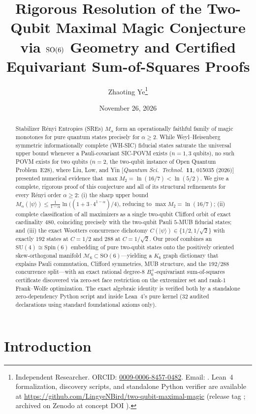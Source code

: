 \documentclass[11pt,a4paper]{article}
\title{\bfseries\Large Rigorous Resolution of the Two-Qubit Maximal Magic Conjecture via $\SO(6)$ Geometry and Certified Equivariant Sum-of-Squares Proofs}
\author{
  Zhaoting Ye\thanks{Independent Researcher. ORCID: \href{https://orcid.org/0009-0006-8457-0482}{0009-0006-8457-0482}. Email: \href{mailto:lingyenbird@qq.com}{\code{lingyenbird@qq.com}}. Lean~4 formalization, discovery scripts, and standalone Python verifier are available at \url{https://github.com/LingyeNBird/two-qubit-maximal-magic} (release tag \code{v1.2}; archived on Zenodo at concept DOI \href{https://doi.org/10.5281/zenodo.24565157}{\code{10.5281/zenodo.24565157}}).}
}
\date{November 26, 2026}
\theoremstyle{plain}
\theoremstyle{definition}
\theoremstyle{remark}
\newcommand{\ket}[1]{\lvert #1 \rangle}
\newcommand{\SO}{\mathrm{SO}}
\newcommand{\SU}{\mathrm{SU}}
\newcommand{\Spin}{\mathrm{Spin}}
\newcommand{\Mman}{\mathcal{M}_6}
\newcommand{\Bplus}{B_6^+}
\begin{document}
\maketitle

\begin{abstract}
Stabilizer R\'enyi Entropies (SREs) $M_\alpha$ form an operationally faithful family of magic monotones for pure quantum states precisely for $\alpha \ge 2$. While Weyl--Heisenberg symmetric informationally complete (WH-SIC) fiducial states saturate the universal upper bound whenever a Pauli-covariant SIC-POVM exists ($n = 1, 3$ qubits), no such POVM exists for two qubits ($n = 2$, the two-qubit instance of Open Quantum Problem~E28), where Liu, Low, and Yin [\textit{Quantum Sci.\ Technol.}\ \textbf{11}, 015035 (2026)] presented numerical evidence that $\max M_2 = \ln(16/7) < \ln(5/2)$. We give a complete, rigorous proof of this conjecture and all of its structural refinements for every R\'enyi order $\alpha \ge 2$: (i) the sharp upper bound $M_\alpha(\ket{\psi}) \le \frac{1}{1-\alpha}\ln\!\bigl((1+3\cdot 4^{1-\alpha})/4\bigr)$, reducing to $\max M_2 = \ln(16/7)$; (ii) complete classification of all maximizers as a single two-qubit Clifford orbit of exact cardinality $480$, coinciding precisely with the two-qubit Pauli $5$-MUB fiducial states; and (iii) the exact Wootters concurrence dichotomy $C(\ket{\psi}) \in \{1/2, 1/\sqrt{2}\}$ with exactly $192$ states at $C = 1/2$ and $288$ at $C = 1/\sqrt{2}$. Our proof combines an $\SU(4) \cong \Spin(6)$ embedding of pure two-qubit states onto the positively oriented skew-orthogonal manifold $\Mman \subset \SO(6)$---yielding a $K_6$ graph dictionary that explains Pauli commutation, Clifford symmetries, MUB structure, and the $192/288$ concurrence split---with an exact rational degree-$8$ $\Bplus$-equivariant sum-of-squares certificate discovered via zero-set face restriction on the extremizer set and rank-$1$ Frank--Wolfe optimization. The exact algebraic identity is verified both by a standalone zero-dependency Python script and inside Lean~4's pure kernel ($32$ audited declarations using standard foundational axioms only).
\end{abstract}

\tableofcontents
\bigskip

\section{Introduction}
\label{sec:intro}
\end{document}

